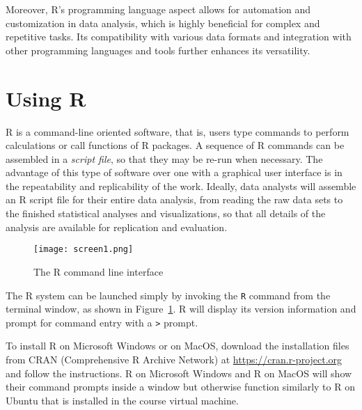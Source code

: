 Moreover, R's programming language aspect allows for automation and customization in data analysis, which is highly beneficial for complex and repetitive tasks. Its compatibility with various data formats and integration with other programming languages and tools further enhances its versatility.

\section{Using R}

R is a command-line oriented software, that is, users type commands to perform calculations or call functions of R packages. A sequence of R commands can be assembled in a \emph{script file}, so that they may be re-run when necessary. The advantage of this type of software over one with a graphical user interface is in the repeatability and replicability of the work. Ideally, data analysts will assemble an R script file for their entire data analysis, from reading the raw data sets to the finished statistical analyses and visualizations, so that all details of the analysis are available for replication and evaluation.

\begin{figure}
\centering
\texttt{[image: screen1.png]}
\caption{The R command line interface}
\label{fig:r}
\end{figure}

The R system can be launched simply by invoking the \texttt{R} command from the terminal window, as shown in Figure~\ref{fig:r}. R will display its version information and prompt for command entry with a \texttt{>} prompt. 

To install R on Microsoft Windows or on MacOS, download the installation files from CRAN (Comprehensive R Archive Network) at \url{https://cran.r-project.org} and follow the instructions. R on Microsoft Windows and R on MacOS will show their command prompts inside a window but otherwise function similarly to R on Ubuntu that is installed in the course virtual machine.

